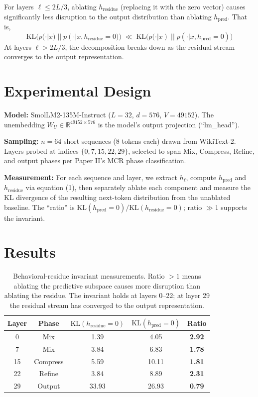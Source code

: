 \documentclass[11pt]{article}
\begin{document}
\begin{conjecture}\label{conj:bri}
For layers $\ell \leq 2L/3$, ablating $h_{\mathrm{residue}}$ (replacing it with the zero vector) causes significantly less disruption to the output distribution than ablating $h_{\mathrm{pred}}$. That is,
\begin{equation}
\mathrm{KL}\big(p(\cdot|x)\;||\;p(\cdot|x, h_{\mathrm{residue}}{=}0)\big) \;\ll\; \mathrm{KL}\big(p(\cdot|x)\;||\;p(\cdot|x, h_{\mathrm{pred}}{=}0)\big)
\end{equation}
At layers $\ell > 2L/3$, the decomposition breaks down as the residual stream converges to the output representation.
\end{conjecture}

\section{Experimental Design}

\textbf{Model:} SmolLM2-135M-Instruct ($L=32$, $d=576$, $V=49152$). The unembedding $W_U \in \mathbb{R}^{49152 \times 576}$ is the model's output projection (``lm\_head'').

\textbf{Sampling:} $n=64$ short sequences (8 tokens each) drawn from WikiText-2. Layers probed at indices $\{0, 7, 15, 22, 29\}$, selected to span Mix, Compress, Refine, and output phases per Paper II's MCR phase classification.

\textbf{Measurement:} For each sequence and layer, we extract $h_\ell$, compute $h_{\mathrm{pred}}$ and $h_{\mathrm{residue}}$ via equation (1), then separately ablate each component and measure the KL divergence of the resulting next-token distribution from the unablated baseline. The ``ratio'' is $\mathrm{KL}(h_{\mathrm{pred}}{=}0) / \mathrm{KL}(h_{\mathrm{residue}}{=}0)$; ratio $\gg 1$ supports the invariant.

\section{Results}

\begin{table}[h]
\centering
\begin{tabular}{c c c c c}
\toprule
Layer & Phase & $\mathrm{KL}(h_{\mathrm{residue}}{=}0)$ & $\mathrm{KL}(h_{\mathrm{pred}}{=}0)$ & Ratio\\
\midrule
0  & Mix      & 1.39 & 4.05  & \textbf{2.92}\\
7  & Mix      & 3.84 & 6.83  & \textbf{1.78}\\
15 & Compress & 5.59 & 10.11 & \textbf{1.81}\\
22 & Refine   & 3.84 & 8.89  & \textbf{2.31}\\
29 & Output   & 33.93 & 26.93 & \textbf{0.79}\\
\bottomrule
\end{tabular}
\caption{Behavioral-residue invariant measurements. Ratio $>1$ means ablating the predictive subspace causes more disruption than ablating the residue. The invariant holds at layers 0--22; at layer 29 the residual stream has converged to the output representation.}
\label{tab:bri}
\end{table}
\end{document}
